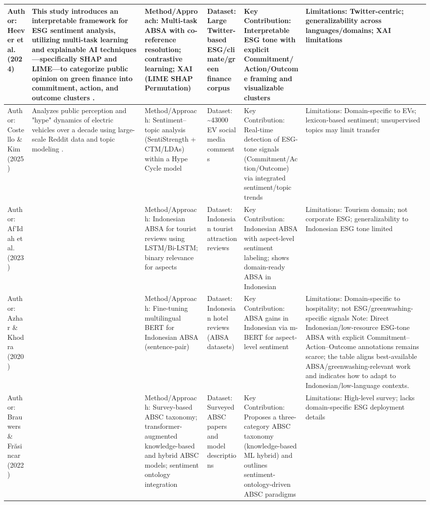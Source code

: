\documentclass{article}
\begin{document}
\begin{landscape}
\begin{longtable}{p{1.8cm}
p{2.6cm}
p{3.4cm}
p{2.6cm}
p{3.5cm}
p{3.5cm}}
Author: Heever et al. (2024) & This study introduces an interpretable framework for ESG sentiment analysis, utilizing multi-task learning and explainable AI techniques—specifically SHAP and LIME—to categorize public opinion on green finance into commitment, action, and outcome clusters  \parencite{wihan_van_der_heever_44c76c99}. & Method/Approach: Multi-task ABSA with co-reference resolution; contrastive learning; XAI (LIME SHAP Permutation) & Dataset: Large Twitter-based ESG/climate/green finance corpus & Key Contribution: Interpretable ESG tone with explicit Commitment/Action/Outcome framing and visualizable clusters & Limitations: Twitter-centric; generalizability across languages/domains; XAI limitations \\ \hline
Author: Costello \& Kim (2025) & Analyzes public perception and "hype" dynamics of electric vehicles over a decade using large-scale Reddit data and topic modeling  \parencite{tao_ruan_824a9480}. & Method/Approach: Sentiment–topic analysis (SentiStrength + CTM/LDAs) within a Hype Cycle model & Dataset: \textasciitilde{}43000 EV social media comments & Key Contribution: Real-time detection of ESG-tone signals (Commitment/Action/Outcome) via integrated sentiment/topic trends & Limitations: Domain-specific to EVs; lexicon-based sentiment; unsupervised topics may limit transfer \\ \hline
Author: Af’Idah et al. (2023) & ~ & Method/Approach: Indonesian ABSA for tourist reviews using LSTM/Bi-LSTM; binary relevance for aspects & Dataset: Indonesian tourist attraction reviews & Key Contribution: Indonesian ABSA with aspect-level sentiment labeling; shows domain-ready ABSA in Indonesian & Limitations: Tourism domain; not corporate ESG; generalizability to Indonesian ESG tone limited \\ \hline
Author: Azhar \& Khodra (2020) & ~ & Method/Approach: Fine-tuning multilingual BERT for Indonesian ABSA (sentence-pair) & Dataset: Indonesian hotel reviews (ABSA datasets) & Key Contribution: ABSA gains in Indonesian via m-BERT for aspect-level sentiment & Limitations: Domain-specific to hospitality; not ESG/greenwashing-specific signals Note: Direct Indonesian/low-resource ESG-tone ABSA with explicit Commitment–Action–Outcome annotations remains scarce; the table aligns best-available ABSA/greenwashing-relevant work and indicates how to adapt to Indonesian/low-language contexts. \\ \hline
Author: Brauwers \& Frăsincar (2022) & ~ & Method/Approach: Survey-based ABSC taxonomy; transformer-augmented knowledge-based and hybrid ABSC models; sentiment ontology integration & Dataset: Surveyed ABSC papers and model descriptions & Key Contribution: Proposes a three-category ABSC taxonomy (knowledge-based ML hybrid) and outlines sentiment-ontology-driven ABSC paradigms & Limitations: High-level survey; lacks domain-specific ESG deployment details \\ \hline

\end{longtable}
\end{landscape}
\end{document}
